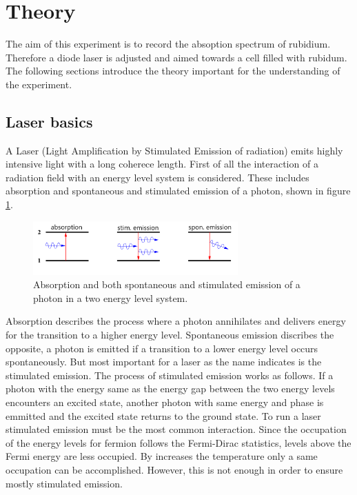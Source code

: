 \section{Theory}
\label{sec:theory}
The aim of this experiment is to record the absoption spectrum
of rubidium. Therefore a diode laser is adjusted and aimed towards a cell
filled with rubidum.
The following sections introduce the theory
important for the understanding of the experiment.

\subsection{Laser basics}
\label{subsec:Laser}
A Laser (Light Amplification by Stimulated Emission of radiation)
emits highly intensive light with a long coherece length.
First of all the interaction of a radiation field with
an energy level system is considered. These includes
absorption and spontaneous and stimulated emission
of a photon, shown in figure \ref{fig:ab_em}.
\begin{figure}
\centering
\includegraphics[width=0.7\textwidth]{ab_und_emiss.png}
\caption{Absorption and both spontaneous and stimulated emission of a photon in a two energy level system.
\cite{V61}}
\label{fig:ab_em}
\end{figure}
Absorption describes the process where a photon annihilates and
delivers energy for the transition
to a higher energy level.
Spontaneous emission discribes the opposite, a photon is
emitted if a transition to a lower energy
level occurs spontaneously.
But most important for a laser as the name indicates
is the stimulated emission.
The process of stimulated emission works as follows.
If a photon with the energy same as
the energy gap between the two energy levels
encounters an excited state, another photon with
same energy and phase is emmitted and the excited state
returns to the ground state.
To run a laser stimulated emission must be the most common interaction.
Since the occupation of the energy levels for fermion follows
the Fermi-Dirac statistics, %
levels above the Fermi energy are
less occupied. By increases the temperature only
a same occupation can be accomplished.
However, this is not enough in order to ensure mostly stimulated emission.
